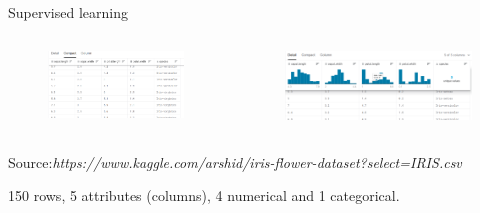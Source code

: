 \begin{frame}[allowframebreaks]{Supervised learning}
	\begin{columns}
		\begin{column}{.5\textwidth}
			\begin{figure}
				\includegraphics[width=1\textwidth, center]{figures/iris_dataset_1}
			\end{figure}
		\end{column}
		\begin{column}{.5\textwidth}
			\begin{figure}
				\includegraphics[width=1\textwidth, center]{figures/iris_dataset_2}
			\end{figure}
		\end{column}
	\end{columns}

\framebreak

	\begin{center}
	{\tiny Source:{\em https://www.kaggle.com/arshid/iris-flower-dataset?select=IRIS.csv}}
	\end{center}
	150 rows, 5 attributes (columns), 4 numerical and 1 categorical.



\end{frame}

